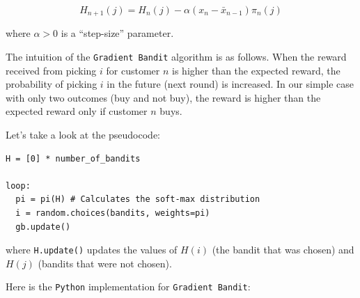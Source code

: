 \documentclass[
]{book}
\theoremstyle{definition}
\theoremstyle{definition}
\theoremstyle{definition}
\theoremstyle{definition}
\theoremstyle{remark}
\begin{document}
\[H_{n+1}(j)=H_n(j)-\alpha(x_n - \bar{x}_{n-1})\pi_n(j)\]

where \(\alpha>0\) is a ``step-size'' parameter.

The intuition of the \texttt{Gradient\ Bandit} algorithm is as follows. When the reward received from picking \(i\) for customer \(n\) is higher than the expected reward, the probability of picking \(i\) in the future (next round) is increased. In our simple case with only two outcomes (buy and not buy), the reward is higher than the expected reward only if customer \(n\) buys.

Let's take a look at the pseudocode:

\begin{verbatim}
H = [0] * number_of_bandits

loop:
  pi = pi(H) # Calculates the soft-max distribution
  i = random.choices(bandits, weights=pi)
  gb.update()
\end{verbatim}

where \texttt{H.update()} updates the values of \(H(i)\) (the bandit that was chosen) and \(H(j)\) (bandits that were not chosen).

Here is the \texttt{Python} implementation for \texttt{Gradient\ Bandit}:
\end{document}
